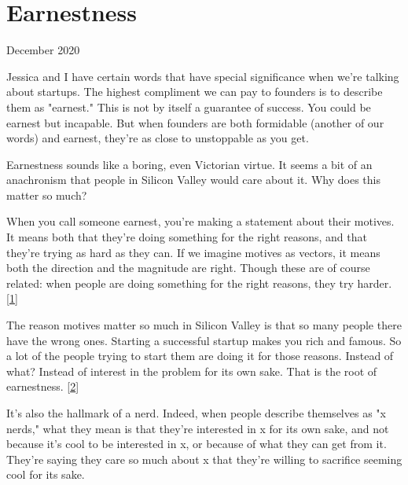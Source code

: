 \chapter{Earnestness}


            
              
                

December 2020

Jessica and I have certain words
                  that have special significance when we're talking about
                  startups. The highest compliment we can pay to founders is to
                  describe them as "earnest." This is not by itself a guarantee
                  of success. You could be earnest but incapable. But when
                  founders are both formidable (another of our words) and
                  earnest, they're as close to unstoppable as you get.

Earnestness
                  sounds like a boring, even Victorian virtue. It seems a bit of
                  an anachronism that people in Silicon Valley would care about
                  it. Why does this matter so much?

When you call
                  someone earnest, you're making a statement about their
                  motives. It means both that they're doing something for the
                  right reasons, and that they're trying as hard as they can. If
                  we imagine motives as vectors, it means both the direction and
                  the magnitude are right. Though these are of course related:
                  when people are doing something for the right reasons, they
                  try harder.
                  [\href{\#f1n}{1}]

The reason motives matter so much in Silicon
                  Valley is that so many people there have the wrong ones.
                  Starting a successful startup makes you rich and famous. So a
                  lot of the people trying to start them are doing it for those
                  reasons. Instead of what? Instead of interest in the problem
                  for its own sake. That is the root of earnestness.
                  [\href{\#f2n}{2}]

It's also the hallmark of a nerd. Indeed, when
                  people describe themselves as "x nerds," what they mean is
                  that they're interested in x for its own sake, and not because
                  it's cool to be interested in x, or because of what they can
                  get from it. They're saying they care so much about x that
                  they're willing to sacrifice seeming cool for its sake.

